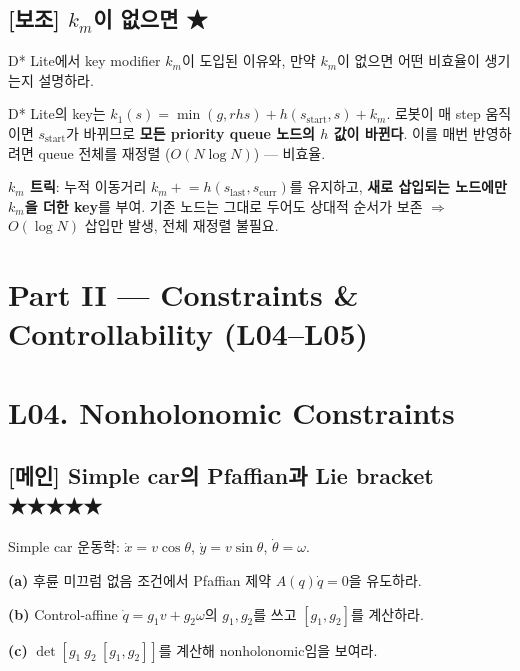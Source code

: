 \documentclass[11pt,a4paper]{article}
\begin{document}
\subsection*{[보조] $k_m$이 없으면 \hfill ★}

\begin{prob}
D* Lite에서 key modifier $k_m$이 도입된 이유와, 만약 $k_m$이 없으면 어떤 비효율이 생기는지 설명하라.
\end{prob}

\begin{sol}
D* Lite의 key는 $k_1(s) = \min(g, rhs) + h(s_{\text{start}}, s) + k_m$. 로봇이 매 step 움직이면 $s_{\text{start}}$가 바뀌므로 \textbf{모든 priority queue 노드의 $h$ 값이 바뀐다}. 이를 매번 반영하려면 queue 전체를 재정렬 ($O(N \log N)$) --- 비효율.

\textbf{$k_m$ 트릭}: 누적 이동거리 $k_m \mathrel{+}= h(s_{\text{last}}, s_{\text{curr}})$를 유지하고, \textbf{새로 삽입되는 노드에만 $k_m$을 더한 key}를 부여. 기존 노드는 그대로 두어도 상대적 순서가 보존 $\Rightarrow$ $O(\log N)$ 삽입만 발생, 전체 재정렬 불필요.
\end{sol}

\section*{Part II --- Constraints \& Controllability (L04--L05)}

\section{L04. Nonholonomic Constraints}

\subsection*{[메인] Simple car의 Pfaffian과 Lie bracket \hfill ★★★★★}

\begin{prob}
Simple car 운동학: $\dot x = v\cos\theta$, $\dot y = v\sin\theta$, $\dot\theta = \omega$.

\textbf{(a)} 후륜 미끄럼 없음 조건에서 Pfaffian 제약 $A(q)\dot q = 0$을 유도하라.

\textbf{(b)} Control-affine $\dot q = g_1 v + g_2 \omega$의 $g_1, g_2$를 쓰고 $[g_1, g_2]$를 계산하라.

\textbf{(c)} $\det[g_1\ g_2\ [g_1, g_2]]$를 계산해 nonholonomic임을 보여라.
\end{prob}
\end{document}
